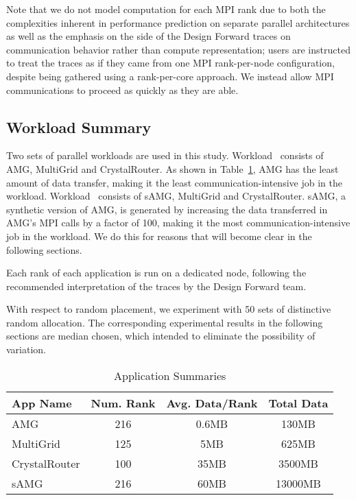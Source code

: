 Note that we do not model computation for each MPI rank due to both the complexities inherent in performance prediction on separate parallel architectures as well as the emphasis on the side of the Design Forward traces on communication behavior rather than compute representation; users are instructed to treat the traces as if they came from one MPI rank-per-node configuration, despite being gathered using a rank-per-core approach. We instead allow MPI communications to proceed as quickly as they are able. 

\subsection{Workload Summary}
\label{sec:workload summary}

Two sets of parallel workloads are used in this study. Workload~ consists of AMG, MultiGrid and CrystalRouter. As shown in Table~\ref{tab:apps-detail}, AMG has the least amount of data transfer, making it the least communication-intensive job in the workload. Workload~ consists of sAMG, MultiGrid and CrystalRouter. sAMG, a synthetic version of AMG, is generated by increasing the data transferred in AMG's MPI calls by a factor of 100, making it the most communication-intensive job in the workload. We do this for reasons that will become clear in the following sections.

Each rank of each application is run on a dedicated node, following the recommended interpretation of the traces by the Design Forward team.

With respect to random placement, we experiment with 50 sets of distinctive random allocation. The corresponding experimental results in the following sections are median chosen, which intended to eliminate the possibility of variation.

\begin{table}[ht]
\begin{center}
\caption{Application Summaries}
\label{tab:apps-detail}
\begin{tabular}{l c c c }
\toprule %
\toprule
App Name & Num. Rank & Avg. Data/Rank & Total Data\\ %
\midrule %
AMG  &    216 &   0.6MB   &     130MB\\ %
\midrule
MultiGrid  &    125 &   5MB   &     625MB\\ 
\midrule
CrystalRouter  &   100  &  35MB    &     3500MB\\ 
\midrule
sAMG  &    216 &   60MB   &     13000MB\\ %
\midrule %
\bottomrule %
\end{tabular}
\end{center}
\end{table}

